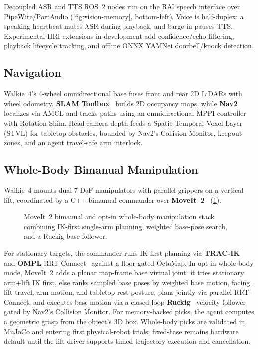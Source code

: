 \documentclass[a4paper]{llncs}
\begin{document}
Decoupled ASR and TTS ROS~2 nodes run on the RAI speech interface over PipeWire/PortAudio (\cref{fig:vision-memory}, bottom-left). Voice is half-duplex: a speaking heartbeat mutes ASR during playback, and barge-in pauses TTS. Experimental HRI extensions in development add confidence/echo filtering, playback lifecycle tracking, and offline ONNX YAMNet doorbell/knock detection.%

\subsection{Navigation}
\label{sec:navigation}

Walkie~4's 4-wheel omnidirectional base fuses front and rear 2D LiDARs with wheel odometry. \textbf{SLAM Toolbox}~\cite{macenski2021slamtoolbox} builds 2D occupancy maps, while \textbf{Nav2}~\cite{macenski2020nav2} localizes via AMCL and tracks paths using an omnidirectional MPPI controller with Rotation Shim. Head-camera depth feeds a Spatio-Temporal Voxel Layer (STVL) for tabletop obstacles, bounded by Nav2's Collision Monitor, keepout zones, and an agent travel-safe arm interlock.

\subsection{Whole-Body Bimanual Manipulation}
\label{sec:manipulation}

Walkie~4 mounts dual 7-DoF manipulators with parallel grippers on a vertical lift, coordinated by a C++ bimanual commander over \textbf{MoveIt~2}~\cite{coleman2014moveit} (\cref{fig:manipulation}).

\begin{figure}[tb]
  \centering
  \resizebox{0.78\textwidth}{!}{}
  \caption{MoveIt~2 bimanual and opt-in whole-body manipulation stack combining IK-first single-arm planning, weighted base-pose search, and a Ruckig base follower.}
  \label{fig:manipulation}
\end{figure}

For stationary targets, the commander runs IK-first planning via \textbf{TRAC-IK}~\cite{beeson2015tracik} and \textbf{OMPL} RRT-Connect~\cite{sucan2012ompl} against a floor-gated OctoMap. In opt-in whole-body mode, MoveIt~2 adds a planar map-frame base virtual joint: it tries stationary arm+lift IK first, else ranks sampled base poses by weighted base motion, facing, lift travel, arm motion, and tabletop rest posture, plans jointly via parallel RRT-Connect, and executes base motion via a closed-loop \textbf{Ruckig}~\cite{berscheid2021ruckig} velocity follower gated by Nav2's Collision Monitor. For memory-backed picks, the agent computes a geometric grasp from the object's 3D box. Whole-body picks are validated in MuJoCo and entering first physical-robot trials; fixed-base remains hardware default until the lift driver supports timed trajectory execution and cancellation.
\end{document}
